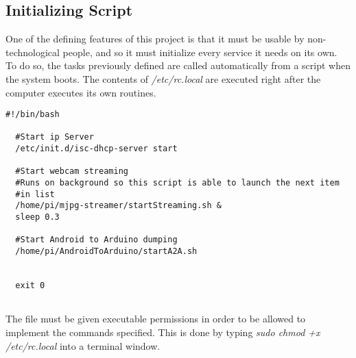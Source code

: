 \subsection{Initializing Script} 

One of the defining features of this project is that it must be usable by non-technological people, and so it must initialize every service it needs on its own. \\

To do so, the tasks previously defined are called automatically from a script when the system boots. The contents of \textit{/etc/rc.local} are executed right after the computer executes its own routines.\\


	\begin{minipage}{\linewidth}%
	\begin{lstlisting}[label=ap-default,caption=Initialization Script {[} /etc/rc.local {]}  ]
  #!/bin/bash

  #Start ip Server
  /etc/init.d/isc-dhcp-server start

  #Start webcam streaming 
  #Runs on background so this script is able to launch the next item 
  #in list
  /home/pi/mjpg-streamer/startStreaming.sh &
  sleep 0.3

  #Start Android to Arduino dumping
  /home/pi/AndroidToArduino/startA2A.sh 


  exit 0


	\end{lstlisting}
	\end{minipage}

\bigskip
The file must be given executable permissions in order to be allowed to implement the commands specified. This is done by typing \textit{sudo chmod +x /etc/rc.local} into a terminal window.